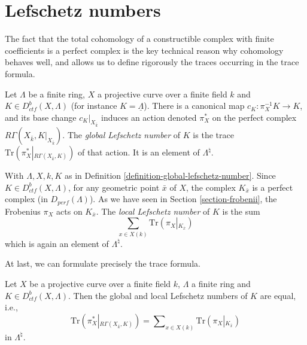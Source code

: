 \section{Lefschetz numbers}
\label{section-lefschetz-numbers}

\noindent
The fact that the total cohomology of a constructible complex with finite
coefficients is a perfect complex is the key technical reason why cohomology
behaves well, and allows us to define rigorously the traces occurring in the
trace formula.

\begin{definition}
\label{definition-global-lefschetz-number}
Let $\Lambda$ be a finite ring, $X$ a projective curve over a finite field $k$
and $K \in D_{ctf}^b(X, \Lambda)$ (for instance $K = \underline\Lambda$).
There is a canonical map $c_K : \pi_X^{-1}K \to K$, and its base change
$c_K|_{X_{\bar k}}$ induces an action denoted $\pi_X^*$ on the perfect
complex $R\Gamma(X_{\bar k}, K|_{X_{\bar k}})$. The
{\it global Lefschetz number} of $K$ is the trace $
\text{Tr}(\pi_X^*\left|_{R\Gamma(X_{\bar k}, K)}\right.)$ of that action.
It is an element of $\Lambda^\natural$.
\end{definition}

\begin{definition}
\label{definition-local-lefschetz-number}
With $\Lambda, X, k, K$ as in
Definition \ref{definition-global-lefschetz-number}.
Since $K\in D_{ctf}^b (X, \Lambda)$, for any geometric point $\bar x$ of $X$,
the complex $K_{\bar x}$ is a perfect complex (in $D_{perf}(\Lambda)$). As we
have seen in Section \ref{section-frobenii}, the Frobenius $\pi_X$ acts on
$K_{\bar x}$. The {\it local Lefschetz number} of $K$ is the sum
$$
\sum_{x\in X(k)} \text{Tr}(\pi_X \left|_{K_{\overline x}}\right.)
$$
which is again an element of $\Lambda^\natural$.
\end{definition}

\noindent
At last, we can formulate precisely the trace formula.

\begin{theorem}
\label{theorem-trace}
Let $X$ be a projective curve over a finite field $k$, $\Lambda$ a finite ring
and $K \in D_{ctf}^b(X, \Lambda)$. Then the global and local Lefschetz numbers
of $K$ are equal, i.e.,
\begin{equation}
\label{equation-trace-formula}
\text{Tr}(\pi^*_X\left|_{R\Gamma(X_{\bar k}, K)}\right.)
=
\sum\nolimits_{x\in X(k)} \text{Tr}(\pi_X\left|_{K_{\bar x}}\right.)
\end{equation}
in $\Lambda^\natural$.
\end{theorem}

